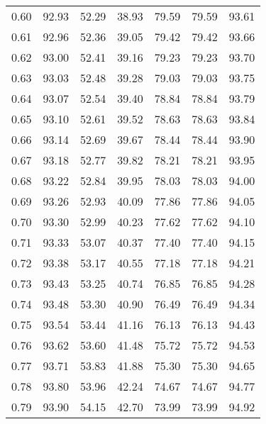 \begin{tabular}{|c|c|c|c|c|c|c|}
      0.60 &     92.93 &     52.29 &      38.93 &   79.59 &      79.59 &         93.61 \\
      0.61 &     92.96 &     52.36 &      39.05 &   79.42 &      79.42 &         93.66 \\
      0.62 &     93.00 &     52.41 &      39.16 &   79.23 &      79.23 &         93.70 \\
      0.63 &     93.03 &     52.48 &      39.28 &   79.03 &      79.03 &         93.75 \\
      0.64 &     93.07 &     52.54 &      39.40 &   78.84 &      78.84 &         93.79 \\
      0.65 &     93.10 &     52.61 &      39.52 &   78.63 &      78.63 &         93.84 \\
      0.66 &     93.14 &     52.69 &      39.67 &   78.44 &      78.44 &         93.90 \\
      0.67 &     93.18 &     52.77 &      39.82 &   78.21 &      78.21 &         93.95 \\
      0.68 &     93.22 &     52.84 &      39.95 &   78.03 &      78.03 &         94.00 \\
      0.69 &     93.26 &     52.93 &      40.09 &   77.86 &      77.86 &         94.05 \\
      0.70 &     93.30 &     52.99 &      40.23 &   77.62 &      77.62 &         94.10 \\
      0.71 &     93.33 &     53.07 &      40.37 &   77.40 &      77.40 &         94.15 \\
      0.72 &     93.38 &     53.17 &      40.55 &   77.18 &      77.18 &         94.21 \\
      0.73 &     93.43 &     53.25 &      40.74 &   76.85 &      76.85 &         94.28 \\
      0.74 &     93.48 &     53.30 &      40.90 &   76.49 &      76.49 &         94.34 \\
      0.75 &     93.54 &     53.44 &      41.16 &   76.13 &      76.13 &         94.43 \\
      0.76 &     93.62 &     53.60 &      41.48 &   75.72 &      75.72 &         94.53 \\
      0.77 &     93.71 &     53.83 &      41.88 &   75.30 &      75.30 &         94.65 \\
      0.78 &     93.80 &     53.96 &      42.24 &   74.67 &      74.67 &         94.77 \\
      0.79 &     93.90 &     54.15 &      42.70 &   73.99 &      73.99 &         94.92 \\

\end{tabular}
